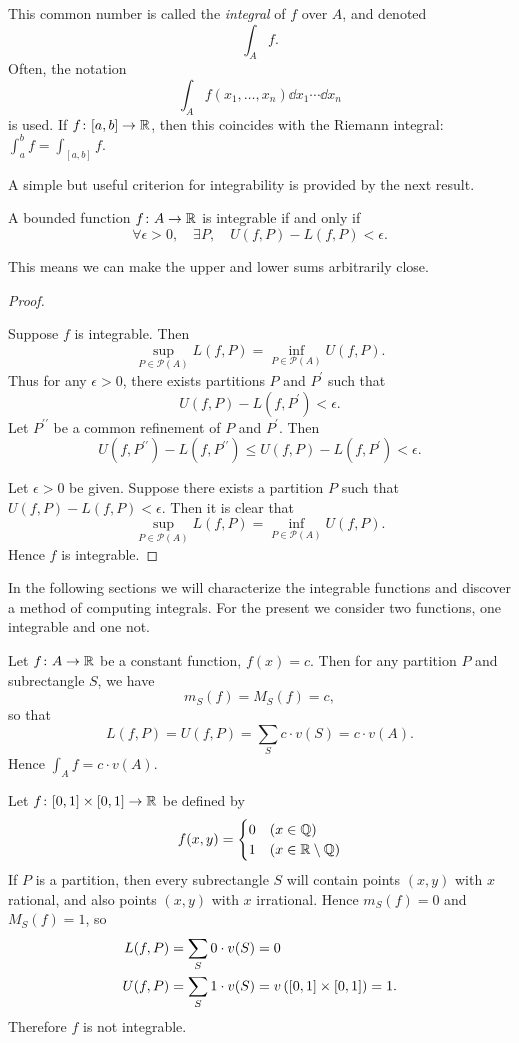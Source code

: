 This common number is called the \emph{integral} of $f$ over $A$, and denoted 
\[\int_A f.\]
Often, the notation
\[\int_{A} f(x_1,\dots,x_n)\dd{x_1}\cdots\dd{x_n}\]
is used.
If $f\colon[a,b]\to\mathbb R$, then this coincides with the Riemann integral: $\int_{a}^{b}f=\int_{[a,b]}f$.

A simple but useful criterion for integrability is provided by the next result.

\begin{lemma}
A bounded function $f\colon A\to\mathbb R$ is integrable if and only if
\[\forall\epsilon>0,\quad\exists P,\quad U(f,P)-L(f,P)<\epsilon.\]
\end{lemma}

This means we can make the upper and lower sums arbitrarily close.

\begin{proof} \

\forward Suppose $f$ is integrable. Then 
\[\sup_{P\in\mathcal{P}(A)}L(f,P)=\inf_{P\in\mathcal{P}(A)}U(f,P).\]
Thus for any $\epsilon>0$, there exists partitions $P$ and $P^\prime$ such that
\[U(f,P)-L(f,P^\prime)<\epsilon.\]
Let $P^{\prime\prime}$ be a common refinement of $P$ and $P^\prime$. Then
\[U(f,P^{\prime\prime})-L(f,P^{\prime\prime})\le U(f,P)-L(f,P^\prime)<\epsilon.\]

\backward Let $\epsilon>0$ be given. Suppose there exists a partition $P$ such that $U(f,P)-L(f,P)<\epsilon$. 
Then it is clear that
\[\sup_{P\in\mathcal{P}(A)}L(f,P)=\inf_{P\in\mathcal{P}(A)}U(f,P).\]
Hence $f$ is integrable.
\end{proof}

In the following sections we will characterize the integrable functions and discover a method of computing integrals. 
For the present we consider two functions, one integrable and one not.

\begin{example}
Let $f\colon A\to\mathbb R$ be a constant function, $f(x)=c$. Then for any partition $P$ and subrectangle $S$, we have
\[m_S(f)=M_S(f)=c,\]
so that
\[L(f,P)=U(f,P)=\sum_{S}c\cdot v(S)=c\cdot v(A).\]
Hence $\int_{A}f=c\cdot v(A)$.
\end{example}

\begin{example}
Let $f\colon[0,1]\times[0,1]\to\mathbb R$ be defined by
\[f(x,y)=\begin{cases}
0&(x\in\mathbb Q)\\
1&(x\in\mathbb R\setminus\mathbb Q)
\end{cases}\]
If $P$ is a partition, then every subrectangle $S$ will contain points $(x,y)$ with $x$ rational, and also points $(x,y)$ with $x$ irrational. 
Hence $m_S(f)=0$ and $M_S(f)=1$, so
\begin{align*}
L(f,P)&=\sum_{S}0\cdot v(S)=0\\
U(f,P)&=\sum_{S}1\cdot v(S)=v\left([0,1]\times[0,1]\right)=1.
\end{align*}
Therefore $f$ is not integrable.
\end{example}

